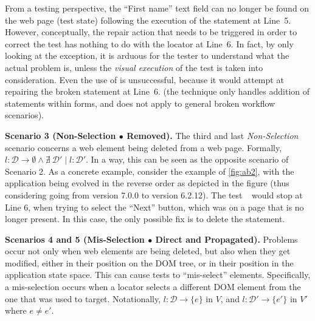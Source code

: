 From a testing perspective, the ``First name'' text field can no longer be found on the web page (test state) following the execution of the statement at Line~5. However, conceptually, the repair action that needs to be triggered in order to correct the test has nothing to do with the locator at Line~6.
In fact, by only looking at the exception, it is arduous for the tester to understand what the actual problem is, unless the \textit{visual execution} of the test is taken into consideration.
%
Even the use of \water is unsuccessful, because it would attempt at repairing the broken statement at Line~6. (the technique only handles addition of statements within forms, and does not apply to general broken workflow scenarios).


\noindent
\textbf{Scenario 3 (Non-Selection $\bullet$ Removed).} 
%
The third and last \textit{Non-Selection} scenario concerns a web element being deleted from a web page. Formally, $l: \mathcal{D} \rightarrow \emptyset \land \nexists \ \mathcal{D'} \mid l: \mathcal{D'}$.
In a way, this can be seen as the opposite scenario of Scenario 2. 
As a concrete example, consider the example of \autoref{fig:ab2}, with the application being evolved in the reverse order as depicted in the figure (thus considering going from version 7.0.0 to version 6.2.12). The test~\textcircled{} would stop at Line 6, when trying to select the ``Next'' button, which was on a page that is no longer present. In this case, the only possible fix is to delete the statement.


\noindent
\textbf{Scenarios 4 and 5 (Mis-Selection $\bullet$ Direct and Propagated).}\label{sec:misselection}
Problems occur not only when web elements are being deleted, but also when they get modified, either in their position on the DOM tree, or in their position in the application state space. This can cause tests to ``mis-select'' elements.
Specifically, a mis-selection occurs when a locator selects a different DOM element from the one that was used to target. 
Notationally, $l: \mathcal{D} \rightarrow \{e\}$ in $V$, and $l: \mathcal{D}' \rightarrow \{e'\}$ in $V'$ where $e \ne e'$.

